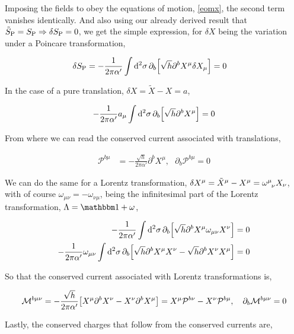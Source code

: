 Imposing the fields to obey the equations of motion, \ref{eomx}, the second term vanishes identically. And also using our 
already derived result that $\tilde S_{\textnormal{P}}=S_{\textnormal{P}}\Rightarrow\delta S_{\textnormal{P}}=0$, we get the simple 
expression, for $\delta X$ being the variation under a Poincare transformation,

\begin{align*}
    \delta S_{\textnormal{P}}&=-\frac{1}{2\pi\alpha'}\int\dd[2]{\sigma}\partial_b\qty[\sqrt{h}\partial^bX^\mu\delta X_\mu]=0
\end{align*}

In the case of a pure translation, $\delta X=\tilde X-X=a$,

\begin{align*}
    -\frac{1}{2\pi\alpha'}a_\mu\int\dd[2]{\sigma}\partial_b\qty[\sqrt{h}\partial^bX^\mu]=0
\end{align*}

From where we can read the conserved current associated with translations,

\begin{align*}
    \mathcal P^{b\mu}&=-\frac{\sqrt{h}}{2\pi\alpha'}\partial^bX^\mu,\ \ \ \partial_b\mathcal P^{b\mu}=0
\end{align*}

We can do the same for a Lorentz transformation, $\delta X^\mu=\tilde X^\mu-X^\mu=\tensor{\omega}{^\mu_\nu}X_\nu$, with of course $\omega_{\mu\nu}=-\omega_{\nu\mu}$, 
being the infinitesimal part of the Lorentz transformation, $\Lambda=\mathbbm 1+\omega$,

\begin{align*}
    -\frac{1}{2\pi\alpha'}\int\dd[2]{\sigma}\partial_b\qty[\sqrt{h}\partial^bX^\mu\omega_{\mu\nu}X^\nu]&=0\\
    -\frac{1}{2\pi\alpha'}\omega_{\mu\nu}\int\dd[2]{\sigma}\partial_b\qty[\sqrt{h}\partial^bX^\mu X^\nu-\sqrt{h}\partial^bX^\nu X^\mu]&=0
\end{align*}

So that the conserved current associated with Lorentz transformations is,

\begin{align*}
    \mathcal M^{b\mu\nu}=-\frac{\sqrt{h}}{2\pi\alpha'}\qty[X^\mu\partial^b X^\nu - X^\nu\partial^b X^\mu]=X^\mu\mathcal P^{b\nu}-X^\nu\mathcal P^{b\mu},\ \ \ \partial_b\mathcal M^{b\mu\nu}=0
\end{align*}

Lastly, the conserved charges that follow from the conserved currents are,

